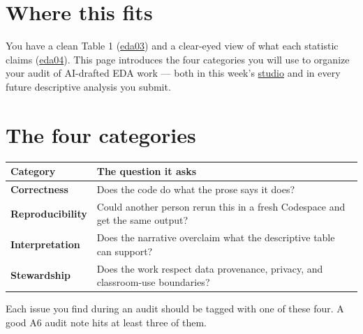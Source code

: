 \documentclass[
  letterpaper,
  DIV=11,
  numbers=noendperiod,
  oneside]{scrreprt}
\begin{document}
\section*{Where this fits}\label{where-this-fits-9}


You have a clean Table 1
(\hyperref[worked-example-eda-and-table-1]{eda03}) and a clear-eyed view
of what each statistic claims
(\hyperref[what-each-statistic-claims-and-does-not]{eda04}). This page
introduces the four categories you will use to organize your audit of
AI-drafted EDA work --- both in this week's
\href{eda06-studio-planted-errors.qmd}{studio} and in every future
descriptive analysis you submit.

\section*{The four categories}\label{the-four-categories}


\begin{longtable}[]{@{}
  >{\raggedright\arraybackslash}p{}
  >{\raggedright\arraybackslash}p{}@{}}
\toprule\noalign{}
\begin{minipage}[b]{\linewidth}\raggedright
Category
\end{minipage} & \begin{minipage}[b]{\linewidth}\raggedright
The question it asks
\end{minipage} \\
\midrule\noalign{}
\endhead
\bottomrule\noalign{}
\endlastfoot
\textbf{Correctness} & Does the code do what the prose says it does? \\
\textbf{Reproducibility} & Could another person rerun this in a fresh
Codespace and get the same output? \\
\textbf{Interpretation} & Does the narrative overclaim what the
descriptive table can support? \\
\textbf{Stewardship} & Does the work respect data provenance, privacy,
and classroom-use boundaries? \\
\end{longtable}

Each issue you find during an audit should be tagged with one of these
four. A good A6 audit note hits at least three of them.
\end{document}

